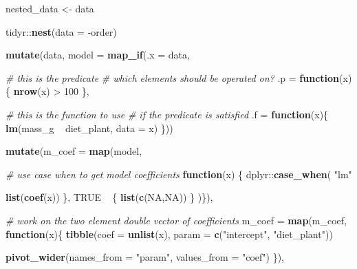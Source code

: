 \documentclass[]{book}
\newenvironment{Shaded}{}{}
\newcommand{\CommentTok}[1]{\textcolor[rgb]{0.38,0.63,0.69}{\textit{#1}}}
\newcommand{\ControlFlowTok}[1]{\textcolor[rgb]{0.00,0.44,0.13}{\textbf{#1}}}
\newcommand{\DataTypeTok}[1]{\textcolor[rgb]{0.56,0.13,0.00}{#1}}
\newcommand{\DecValTok}[1]{\textcolor[rgb]{0.25,0.63,0.44}{#1}}
\newcommand{\KeywordTok}[1]{\textcolor[rgb]{0.00,0.44,0.13}{\textbf{#1}}}
\newcommand{\NormalTok}[1]{#1}
\newcommand{\OperatorTok}[1]{\textcolor[rgb]{0.40,0.40,0.40}{#1}}
\newcommand{\OtherTok}[1]{\textcolor[rgb]{0.00,0.44,0.13}{#1}}
\newcommand{\StringTok}[1]{\textcolor[rgb]{0.25,0.44,0.63}{#1}}
\begin{document}
\begin{Shaded}
\begin{Highlighting}[]
\NormalTok{nested_data <-}
\StringTok{  }\NormalTok{data }\OperatorTok{%
\StringTok{  }\NormalTok{tidyr}\OperatorTok{::}\KeywordTok{nest}\NormalTok{(}\DataTypeTok{data =} \OperatorTok{-}\NormalTok{order) }\OperatorTok{%
\StringTok{  }\KeywordTok{mutate}\NormalTok{(data,}
         \DataTypeTok{model =} \KeywordTok{map_if}\NormalTok{(}\DataTypeTok{.x =}\NormalTok{ data,}
                        
                        \CommentTok{# this is the predicate}
                        \CommentTok{# which elements should be operated on?}
                        \DataTypeTok{.p =} \ControlFlowTok{function}\NormalTok{(x)\{}
                          \KeywordTok{nrow}\NormalTok{(x) }\OperatorTok{>}\StringTok{ }\DecValTok{100}
\NormalTok{                        \},}
                        
                        \CommentTok{# this is the function to use}
                        \CommentTok{# if the predicate is satisfied}
                        \DataTypeTok{.f =} \ControlFlowTok{function}\NormalTok{(x)\{}
                          \KeywordTok{lm}\NormalTok{(mass_g }\OperatorTok{~}\StringTok{ }\NormalTok{diet_plant, }\DataTypeTok{data =}\NormalTok{ x)}
\NormalTok{                        \})) }\OperatorTok{%
\StringTok{  }
\StringTok{  }\KeywordTok{mutate}\NormalTok{(}\DataTypeTok{m_coef =} \KeywordTok{map}\NormalTok{(model,}
                      
                      \CommentTok{# use case when to get model coefficients}
                      \ControlFlowTok{function}\NormalTok{(x) \{}
\NormalTok{                        dplyr}\OperatorTok{::}\KeywordTok{case_when}\NormalTok{(}
                          \StringTok{"lm"} \OperatorTok{%
                            \KeywordTok{list}\NormalTok{(}\KeywordTok{coef}\NormalTok{(x))}
\NormalTok{                          \},}
                          \OtherTok{TRUE} \OperatorTok{~}\StringTok{ }\NormalTok{\{}
                            \KeywordTok{list}\NormalTok{(}\KeywordTok{c}\NormalTok{(}\OtherTok{NA}\NormalTok{,}\OtherTok{NA}\NormalTok{))}
\NormalTok{                          \}}
\NormalTok{                        )\}), }
         
         \CommentTok{# work on the two element double vector of coefficients}
         \DataTypeTok{m_coef =} \KeywordTok{map}\NormalTok{(m_coef, }\ControlFlowTok{function}\NormalTok{(x)\{}
           \KeywordTok{tibble}\NormalTok{(}\DataTypeTok{coef =} \KeywordTok{unlist}\NormalTok{(x),}
                  \DataTypeTok{param =} \KeywordTok{c}\NormalTok{(}\StringTok{"intercept"}\NormalTok{, }\StringTok{"diet_plant"}\NormalTok{)) }\OperatorTok{%
\StringTok{             }\KeywordTok{pivot_wider}\NormalTok{(}\DataTypeTok{names_from =} \StringTok{"param"}\NormalTok{,}
                         \DataTypeTok{values_from =} \StringTok{"coef"}\NormalTok{)}
\NormalTok{         \}),}
         
}}}}}
\end{Highlighting}
\end{Shaded}
\end{document}
